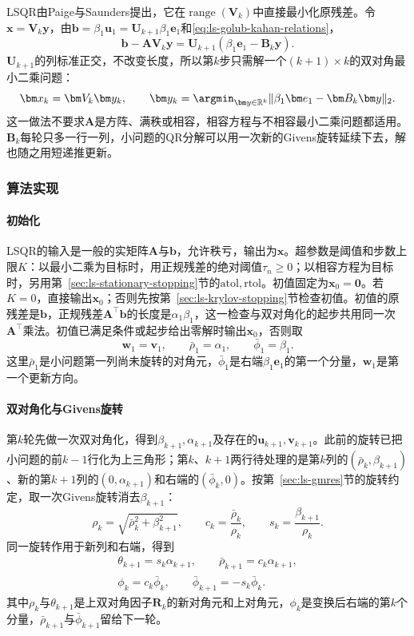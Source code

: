 LSQR由Paige与Saunders提出，它在$\operatorname{range}(\bm V_k)$中直接最小化原残差。令$\bm x=\bm V_k\bm y$，由$\bm b=\beta_1\bm u_1=\bm U_{k+1}\beta_1\bm e_1$和\eqref{eq:ls-golub-kahan-relations}，
\[
 \bm b-\bm A\bm V_k\bm y=\bm U_{k+1}(\beta_1\bm e_1-\bm B_k\bm y).
\]
$\bm U_{k+1}$的列标准正交，不改变长度，所以第$k$步只需解一个$(k+1)\times k$的双对角最小二乘问题：
\begin{equation}
 \bm x_k=\bm V_k\bm y_k,\qquad
 \bm y_k=\argmin_{\bm y\in\mathbb R^k}\lVert\beta_1\bm e_1-\bm B_k\bm y\rVert_2 .
 \label{eq:ls-lsqr-subproblem}
\end{equation}
这一做法不要求$\bm A$是方阵、满秩或相容，相容方程与不相容最小二乘问题都适用。$\bm B_k$每轮只多一行一列，小问题的QR分解可以用一次新的Givens旋转延续下去，解也随之用短递推更新。

\subsubsection{算法实现}

\paragraph{初始化}
LSQR的输入是一般的实矩阵$\bm A$与$\bm b$，允许秩亏，输出为$\bm x$。超参数是阈值和步数上限$K$：以最小二乘为目标时，用正规残差的绝对阈值$\tau_n\ge0$；以相容方程为目标时，另用第~\ref{sec:ls-stationary-stopping}节的$\mathrm{atol},\mathrm{rtol}$。初值固定为$\bm x_0=\bm0$。若$K=0$，直接输出$\bm x_0$；否则先按第~\ref{sec:ls-krylov-stopping}节检查初值。初值的原残差是$\bm b$，正规残差$\bm A^\top\bm b$的长度是$\alpha_1\beta_1$，这一检查与双对角化的起步共用同一次$\bm A^\top$乘法。初值已满足条件或起步给出零解时输出$\bm x_0$，否则取
\[
 \bm w_1=\bm v_1,\qquad \bar\rho_1=\alpha_1,\qquad \bar\phi_1=\beta_1 .
\]
这里$\bar\rho_1$是小问题第一列尚未旋转的对角元，$\bar\phi_1$是右端$\beta_1\bm e_1$的第一个分量，$\bm w_1$是第一个更新方向。

\paragraph{双对角化与Givens旋转}
第$k$轮先做一次双对角化，得到$\beta_{k+1},\alpha_{k+1}$及存在的$\bm u_{k+1},\bm v_{k+1}$。此前的旋转已把小问题的前$k-1$行化为上三角形；第$k$、$k+1$两行待处理的是第$k$列的$(\bar\rho_k,\beta_{k+1})$、新的第$k+1$列的$(0,\alpha_{k+1})$和右端的$(\bar\phi_k,0)$。按第~\ref{sec:ls-gmres}节的旋转约定，取一次Givens旋转消去$\beta_{k+1}$：
\[
 \rho_k=\sqrt{\bar\rho_k^2+\beta_{k+1}^2},\qquad
 c_k=\frac{\bar\rho_k}{\rho_k},\qquad s_k=\frac{\beta_{k+1}}{\rho_k}.
\]
同一旋转作用于新列和右端，得到
\[
 \begin{gathered}
 \theta_{k+1}=s_k\alpha_{k+1},\qquad
 \bar\rho_{k+1}=c_k\alpha_{k+1},\\
 \phi_k=c_k\bar\phi_k,\qquad
 \bar\phi_{k+1}=-s_k\bar\phi_k .
 \end{gathered}
\]
其中$\rho_k$与$\theta_{k+1}$是上双对角因子$\bm R_k$的新对角元和上对角元，$\phi_k$是变换后右端的第$k$个分量，$\bar\rho_{k+1}$与$\bar\phi_{k+1}$留给下一轮。


